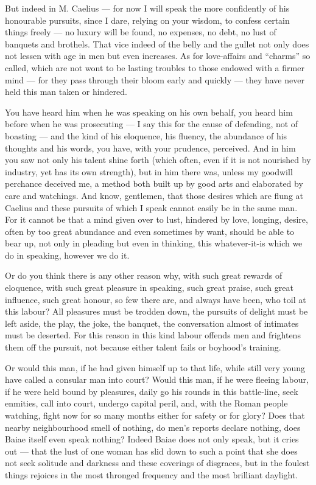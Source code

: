  But indeed in M. Caelius --- for now I will speak the more confidently of his honourable pursuits, since I dare, relying on your wisdom, to confess certain things freely --- no luxury will be found, no expenses, no debt, no lust of banquets and brothels. That vice indeed of the belly and the gullet not only does not lessen with age in men but even increases. As for love-affairs and ``charms'' so called, which are not wont to be lasting troubles to those endowed with a firmer mind --- for they pass through their bloom early and quickly --- they have never held this man taken or hindered.

 You have heard him when he was speaking on his own behalf, you heard him before when he was prosecuting --- I say this for the cause of defending, not of boasting --- and the kind of his eloquence, his fluency, the abundance of his thoughts and his words, you have, with your prudence, perceived. And in him you saw not only his talent shine forth (which often, even if it is not nourished by industry, yet has its own strength), but in him there was, unless my goodwill perchance deceived me, a method both built up by good arts and elaborated by care and watchings. And know, gentlemen, that those desires which are flung at Caelius and these pursuits of which I speak cannot easily be in the same man. For it cannot be that a mind given over to lust, hindered by love, longing, desire, often by too great abundance and even sometimes by want, should be able to bear up, not only in pleading but even in thinking, this whatever-it-is which we do in speaking, however we do it.

 Or do you think there is any other reason why, with such great rewards of eloquence, with such great pleasure in speaking, such great praise, such great influence, such great honour, so few there are, and always have been, who toil at this labour? All pleasures must be trodden down, the pursuits of delight must be left aside, the play, the joke, the banquet, the conversation almost of intimates must be deserted. For this reason in this kind labour offends men and frightens them off the pursuit, not because either talent fails or boyhood's training.

 Or would this man, if he had given himself up to that life, while still very young have called a consular man into court? Would this man, if he were fleeing labour, if he were held bound by pleasures, daily go his rounds in this battle-line, seek enmities, call into court, undergo capital peril, and, with the Roman people watching, fight now for so many months either for safety or for glory? Does that nearby neighbourhood smell of nothing, do men's reports declare nothing, does Baiae itself even speak nothing? Indeed Baiae does not only speak, but it cries out --- that the lust of one woman has slid down to such a point that she does not seek solitude and darkness and these coverings of disgraces, but in the foulest things rejoices in the most thronged frequency and the most brilliant daylight.

